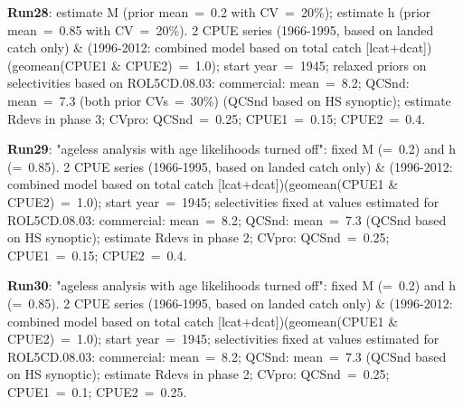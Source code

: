 {\bf Run28}: estimate M (prior mean~=~0.2 with CV~=~20\%); estimate h (prior mean~=~0.85 with CV~=~20\%). 2 CPUE series (1966-1995, based on landed catch only) \& (1996-2012: combined model based on total catch [lcat+dcat])(geomean(CPUE1 \& CPUE2)~=~1.0); start year~=~1945; relaxed priors on selectivities based on ROL5CD.08.03: commercial: mean~=~8.2; QCSnd: mean~=~7.3 (both prior CVs~=~30\%) (QCSnd based on HS synoptic); estimate Rdevs in phase 3; CVpro: QCSnd~=~0.25; CPUE1~=~0.15; CPUE2~=~0.4. \newline

{\bf Run29}: "ageless analysis with age likelihoods turned off": fixed M (=~0.2) and h (=~0.85). 2 CPUE series (1966-1995, based on landed catch only) \& (1996-2012: combined model based on total catch [lcat+dcat])(geomean(CPUE1 \& CPUE2)~=~1.0); start year~=~1945; selectivities fixed at values estimated for ROL5CD.08.03: commercial: mean~=~8.2; QCSnd: mean~=~7.3 (QCSnd based on HS synoptic); estimate Rdevs in phase 2; CVpro: QCSnd~=~0.25; CPUE1~=~0.15; CPUE2~=~0.4. \newline

{\bf Run30}: "ageless analysis with age likelihoods turned off": fixed M (=~0.2) and h (=~0.85). 2 CPUE series (1966-1995, based on landed catch only) \& (1996-2012: combined model based on total catch [lcat+dcat])(geomean(CPUE1 \& CPUE2)~=~1.0); start year~=~1945; selectivities fixed at values estimated for ROL5CD.08.03: commercial: mean~=~8.2; QCSnd: mean~=~7.3 (QCSnd based on HS synoptic); estimate Rdevs in phase 2; CVpro: QCSnd~=~0.25; CPUE1~=~0.1; CPUE2~=~0.25. \newline


